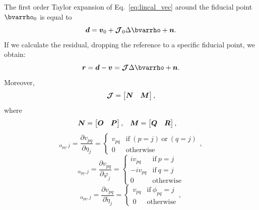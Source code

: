 \documentclass[useAMS,usenatbib]{mn2e}
\newcommand{\br}{\bmath{r}}
\newcommand{\bd}{\bmath{d}}
\newcommand{\bv}{\bmath{v}}
\newcommand{\bn}{\bmath{n}}
\newcommand{\bN}{\bmath{N}}
\newcommand{\bM}{\bmath{M}}
\newcommand{\bO}{\bmath{O}}
\newcommand{\bP}{\bmath{P}}
\newcommand{\bQ}{\bmath{Q}}
\newcommand{\bR}{\bmath{R}}
\newcommand{\bmJ}{\bmath{\mathcal{J}}}
\begin{document}
The first order Taylor expansion of Eq.~\eqref{eq:lincal_vec} around the fiducial point $\bvarrho_0$ is equal to
\begin{equation}
\label{eq:d_lin}
\bd = \bv_0 + \bmJ_0 \Delta \bvarrho  + \bn.
\end{equation}
If we calculate the residual, dropping the reference to a specific fiducial point, we obtain: 
\begin{equation}
\label{eq:r_lin}
\br = \bd - \bv = \bmJ \Delta \bvarrho + \bn.
\end{equation}
Moreover,
\begin{equation}
\label{eq:jac_upper_lincal}
\bmJ = \begin{bmatrix}
       \bN & \bM 
       \end{bmatrix},
\end{equation}
where
\begin{align}
\bN &= \begin{bmatrix} \bO & \bP \end{bmatrix}, & \bM &= \begin{bmatrix} \bQ & \bR \end{bmatrix}, 
\end{align}
\begin{equation}
 [\bO]_{\alpha_{pq},j} =  \frac{\partial v_{pq}}{\partial \eta_j} = \begin{cases} 
    v_{pq} &\textrm{if}~(p=j)~\textrm{or}~(q=j)\\
    0 & \textrm{otherwise}
   \end{cases},
\end{equation}
\begin{equation}
 [\bP]_{\alpha_{pq},j} =  \frac{\partial v_{pq}}{\partial \varphi_j} = \begin{cases}
                                                                        i v_{pq} &\textrm{if}~ p=j\\
                                                                        -i v_{pq} &\textrm{if}~ q=j \\
                                                                        0 & \textrm{otherwise} 
                                                                       \end{cases}
\end{equation}
\begin{equation}
 [\bQ]_{\alpha_{pq},j} =  \frac{\partial v_{pq}}{\partial \widetilde{\eta}_j} = \begin{cases} 
    v_{pq} &\textrm{if}~\phi_{pq}=j\\
    0 & \textrm{otherwise}
   \end{cases},
\end{equation}
\end{document}
